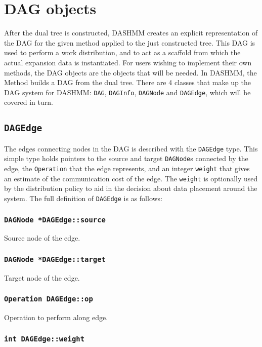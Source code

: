\section{DAG objects}

After the dual tree is constructed, DASHMM creates an explicit representation
of the DAG for the given method applied to the just constructed tree. This DAG
is used to perform a work distribution, and to act as a scaffold from which
the actual expansion data is instantiated. For users wishing to implement
their own methods, the DAG objects are the objects that will be needed. In
DASHMM, the Method builds a DAG from the dual tree. There are 4 classes that
make up the DAG system for DASHMM: \texttt{DAG}, \texttt{DAGInfo},
\texttt{DAGNode} and \texttt{DAGEdge}, which will be covered in turn.

\subsection{\texttt{DAGEdge}}

The edges connecting nodes in the DAG is described with the \texttt{DAGEdge}
type. This simple type holds pointers to the source and target
\texttt{DAGNode}s connected by the edge, the \texttt{Operation} that the edge
represents, and an integer \texttt{weight} that gives an estimate of the
communication cost of the edge. The \texttt{weight} is optionally used by the
distribution policy to aid in the decision about data placement around the
system. The full definition of \texttt{DAGEdge} is as follows:

\subsubsection{\texttt{DAGNode *DAGEdge::source}}

Source node of the edge.

\subsubsection{\texttt{DAGNode *DAGEdge::target}}

Target node of the edge.

\subsubsection{\texttt{Operation DAGEdge::op}}

Operation to perform along edge.

\subsubsection{\texttt{int DAGEdge::weight}}

